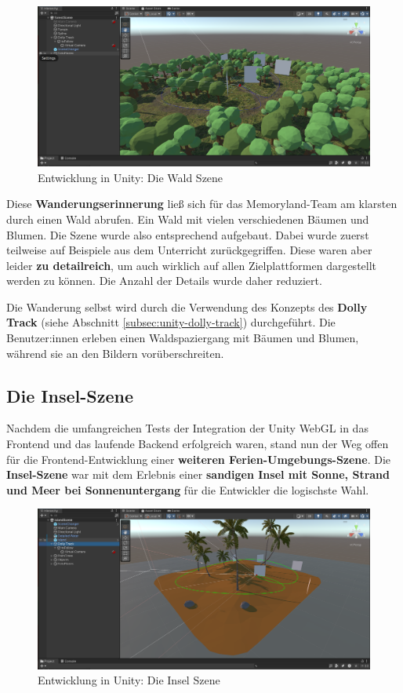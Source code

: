 \begin{figure} [h t]
    \centering
    \includegraphics[scale=0.15]{pics/unity-edit-forest.png}
    \caption{Entwicklung in Unity: Die Wald Szene}
    \label{fig:unity-edit-forest}
\end{figure}


Diese \textbf{Wanderungserinnerung} ließ sich für das Memoryland-Team am klarsten durch einen Wald abrufen. Ein Wald mit vielen verschiedenen Bäumen und Blumen. Die Szene wurde also entsprechend aufgebaut. Dabei wurde zuerst teilweise auf Beispiele aus dem Unterricht zurückgegriffen. Diese waren aber leider \textbf{zu detailreich}, um auch wirklich auf allen Zielplattformen dargestellt werden zu können. Die Anzahl der Details wurde daher reduziert.

Die Wanderung selbst wird durch die Verwendung des Konzepts des \textbf{Dolly Track} (siehe Abschnitt \ref{subsec:unity-dolly-track}) durchgeführt. Die Benutzer:innen erleben einen Waldspaziergang mit Bäumen und Blumen, während sie an den Bildern vorüberschreiten.


\subsection{Die Insel-Szene}

Nachdem die umfangreichen Tests der Integration der Unity WebGL in das Frontend und das laufende Backend erfolgreich waren, stand nun der Weg offen für die Frontend-Entwicklung einer \textbf{weiteren Ferien-Umgebungs-Szene}. Die \textbf{Insel-Szene} war mit dem Erlebnis einer \textbf{sandigen Insel mit Sonne, Strand und Meer bei Sonnenuntergang} für die Entwickler die logischste Wahl.   


\begin{figure} [h t]
    \centering
    \includegraphics[scale=0.15]{pics/unity-edit-island.png}
    \caption{Entwicklung in Unity: Die Insel Szene}
    \label{fig:unity-edit-island}
\end{figure}


